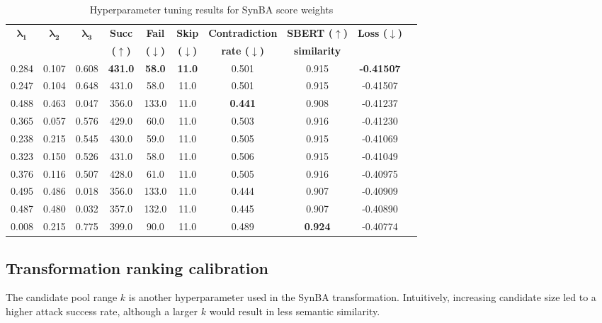 \begin{table}[hb]
    \footnotesize
    \centering
    \begin{tabular}{|c|c|c|c|c|c|c|c|c|c|}
        \hline
        $\bm{\lambda_1}$ & $\bm{\lambda_2}$ & $\bm{\lambda_3}$ &  \textbf{Succ} &  \textbf{Fail} &  \textbf{Skip} &  \textbf{Contradiction} &  \textbf{SBERT ($\bm{\uparrow}$)} &  \textbf{Loss  ($\bm{\downarrow}$)} \\
         &  &  & \textbf{($\bm{\uparrow}$)} &  \textbf{($\bm{\downarrow}$)} & \textbf{($\bm{\downarrow}$)} &  \textbf{rate  ($\bm{\downarrow}$)} &  \textbf{similarity} & \\
        \hline
        \hline
        0.284 & 0.107 & 0.608 & \textbf{431.0} &  \textbf{58.0} &  \textbf{11.0} &  0.501 &  0.915 &  \textbf{-0.41507} \\
        0.247 & 0.104 & 0.648 & 431.0 &  58.0 &  11.0 &  0.501 &  0.915 &  -0.41507 \\
        0.488 & 0.463 & 0.047 & 356.0 & 133.0 &  11.0 &  \textbf{0.441} &  0.908 &  -0.41237 \\
        0.365 & 0.057 & 0.576 & 429.0 &  60.0 &  11.0 &  0.503 &  0.916 &  -0.41230 \\
        0.238 & 0.215 & 0.545 & 430.0 &  59.0 &  11.0 &  0.505 &  0.915 &  -0.41069 \\
        0.323 & 0.150 & 0.526 & 431.0 &  58.0 &  11.0 &  0.506 &  0.915 &  -0.41049 \\
        0.376 & 0.116 & 0.507 & 428.0 &  61.0 &  11.0 &  0.505 &  0.916 &  -0.40975 \\
        0.495 & 0.486 & 0.018 & 356.0 & 133.0 &  11.0 &  0.444 &  0.907 &  -0.40909 \\
        0.487 & 0.480 & 0.032 & 357.0 & 132.0 &  11.0 &  0.445 &  0.907 &  -0.40890 \\
        0.008 & 0.215 & 0.775 & 399.0 &  90.0 &  11.0 &  0.489 &  \textbf{0.924} &  -0.40774 \\
        \hline
    \end{tabular}
\caption{Hyperparameter tuning results for SynBA score weights}
\label{tab:3_5_hyperparameter_tuning}
\end{table}


\subsection{Transformation ranking calibration}\label{subsec:transformation-ranking-calibration}
The candidate pool range $k$ is another hyperparameter used in the SynBA transformation.
Intuitively, increasing candidate size led to a higher attack success rate, although a larger 
$k$ would result in less semantic similarity.

